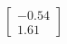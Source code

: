\documentclass[preview]{standalone}
\begin{document}
\begin{align*}
\begin{bmatrix} -0.54 \\ 1.61 \end{bmatrix}
\end{align*}
\end{document}
